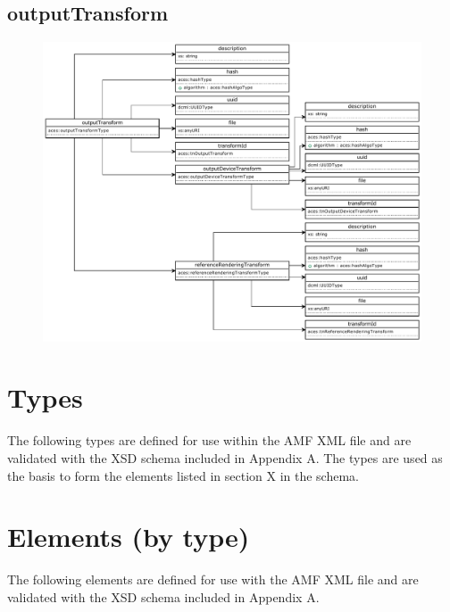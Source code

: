 \subsection{outputTransform}
\begin{figure}[H]
  \centering
  \includegraphics[width=\textwidth]{./uml_diagrams/uml_outputTransform.pdf}
\end{figure}


\section{Types}

The following types are defined for use within the AMF XML file and are validated with the XSD schema included in Appendix A.  The types are used as the basis to form the elements listed in section X in the schema.




\newpage
\section{Elements (by type)}

The following elements are defined for use with the AMF XML file and are validated with the XSD schema included in Appendix A. 




